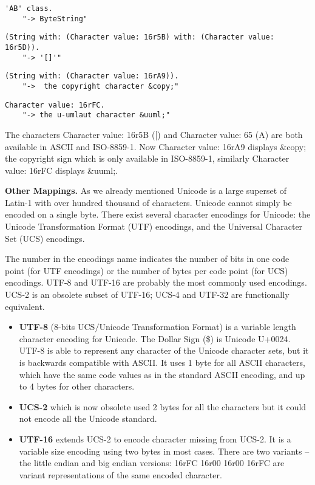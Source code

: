\documentclass[a4paper,10pt,twoside]{book}
\newcommand{\ct}[1]{{\small\ttfamily\textup{#1}}}
\begin{document}
\begin{lstlisting}
'AB' class.
	"-> ByteString"
\end{lstlisting}

\begin{lstlisting}
(String with: (Character value: 16r5B) with: (Character value: 16r5D)).
	"-> '[]'"
\end{lstlisting}

\begin{lstlisting}
(String with: (Character value: 16rA9)).
	"->  the copyright character &copy;"
\end{lstlisting}

\begin{lstlisting}
Character value: 16rFC.
	"-> the u-umlaut character &uuml;"
\end{lstlisting}

The characters \ct{Character value: 16r5B} (\ct{{[}}) and \ct{Character value: 65} (\ct{A}) are both available in ASCII and ISO-8859-1. Now \ct{Character value: 16rA9} displays \&copy; the copyright sign which is only available in ISO-8859-1, similarly \ct{Character value: 16rFC} displays \&uuml;.

\textbf{Other Mappings.}
As we already mentioned Unicode is a large superset of Latin-1 with over hundred thousand of characters. Unicode cannot simply be encoded on a single byte. There exist several character encodings for Unicode: the Unicode Transformation Format (UTF) encodings, and the Universal Character Set (UCS) encodings.

The number in the encodings name indicates the number of bits in one code point (for UTF encodings) or the number of bytes per code point (for UCS) encodings. UTF-8 and UTF-16 are probably the most commonly used encodings. UCS-2 is an obsolete subset of UTF-16; UCS-4 and UTF-32 are functionally equivalent.

\begin{itemize}
\item  \textbf{UTF-8} (8-bits UCS$/$Unicode Transformation Format) is a variable length character encoding for Unicode. The Dollar  Sign (\ct{\$}) is Unicode U+0024. UTF-8 is able to represent any character of the Unicode character sets, but it is  backwards compatible with ASCII. It uses 1 byte for all ASCII characters, which have the same code values as in the  standard ASCII encoding, and up to 4 bytes for other characters.
\item  \textbf{UCS-2} which is now obsolete used 2 bytes for all the characters but it could not encode all the Unicode standard.
\item  \textbf{UTF-16} extends UCS-2 to encode character missing from UCS-2. It is a variable size encoding using two bytes in most cases. There  are two variants -- the little endian and big endian versions: \ct{16rFC 16r00} \ct{16r00 16rFC} are variant representations of the same encoded character.
\end{itemize}
\end{document}
